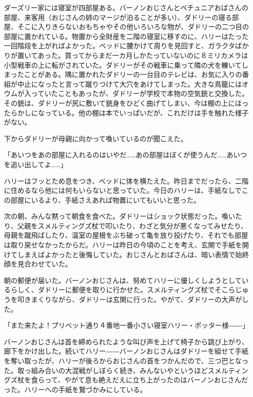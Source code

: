 \documentclass[10pt,a4paper]{article}
\begin{document}
\begin{CJK}{UTF8}{min}
ダーズリー家には寝室が四部屋ある。バーノンおじさんとペチュニアおばさんの部屋、来客用（おじさんの姉のマージが泊ることが多い）、ダドリーの寝る部屋、そこに入りきらないおもちゃやその他いろいろな物が、ダドリーの二つ目の部屋に置かれている。物置から全財産を二階の寝室に移すのに、ハリーはたった一回階段を上がればよかった。ベッドに腰かけて周りを見回すと、ガラクタばかりが置いてあった。買ってからまだ一カ月しかたっていないのに８ミリカメラは小型戦車の上に転がされていた。ダドリーがその戦車に乗って隣の犬を轢いてしまったことがある。隅に置かれたダドリーの一台目のテレビは、お気に入りの番組が中止になったと言って蹴りつけて大穴をあけてしまった。大きな鳥籠にはオウムが入っていたこともあったが、ダドリーが学校で本物の空気銃と交換した。その銃は、ダドリーが尻に敷いて銃身をひどく曲げてしまい、今は棚の上にほったらかしになっている。他の棚は本でいっぱいだが、これだけは手を触れた様子がない。

下からダドリーが母親に向かって喚いているのが聞こえた。

「あいつをあの部屋に入れるのはいやだ……あの部屋はぼくが使うんだ……あいつを追い出してよ……」

ハリーはフッとため息をつき、ベッドに体を横たえた。昨日までだったら、二階に住めるなら他には何もいらないと思っていた。今日のハリーは、手紙なしでこの部屋にいるより、手紙さえあれば物置にいてもいいと思った。

次の朝、みんな黙って朝食を食べた。ダドリーはショック状態だった。喚いたり、父親をスメルティングズ杖で叩いたり、わざと気分が悪くなってみせたり、母親を蹴飛ばしたり、温室の屋根をぶち破って亀を放り投げたり、それでも部屋は取り戻せなかったからだ。ハリーは昨日の今頃のことを考え、玄関で手紙を開けてしまえばよかったと後悔していた。おじさんとおばさんは、暗い表情で始終顔を見合わせていた。

朝の郵便が届いた。バーノンおじさんは、努めてハリーに優しくしようとしているらしく、ダドリーに郵便を取りに行かせた。スメルティングズ杖でそこらじゅうを叩きまくりながら、ダドリーは玄関に行った。やがて、ダドリーの大声がした。

「また来たよ！プリベット通り４番地一番小さい寝室ハリー・ポッター様――」

バーノンおじさんは首を締められたような叫び声を上げて椅子から跳び上がり、廊下をかけ出した。続いてハリー――バーノンおじさんはダドリーを組せて手紙を奪い取ったが、ハリーが後ろからおじさんの首をつかんだので、三つ巴となった。取っ組み合いの大混戦がしぼらく続き、みんないやというほどスメルティングズ杖を食らって、やがて息も絶えだえに立ち上がったのはバーノンおじさんだった。ハリーへの手紙を鷲づかみにしている。


\end{CJK}
\end{document}
